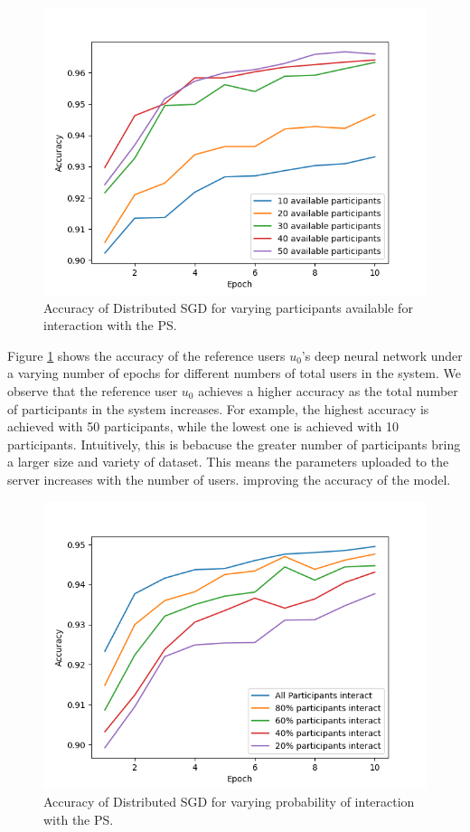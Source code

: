 \documentclass[conference]{IEEEtran}
\begin{document}
\begin{figure}[!h]
\centering
\includegraphics[width=\columnwidth, keepaspectratio]{VaryingPoolofParticipants}
\caption{Accuracy of Distributed SGD for varying participants available for interaction with the PS.}
\label{fig:VaryingPoolofParticipants}
\end{figure}

Figure \ref{fig:VaryingPoolofParticipants} shows the accuracy of the reference users $u_0$'s deep neural network under a varying number of epochs for different numbers of total users in the system. We observe that 
the reference user $u_0$ achieves a higher accuracy as the total number of participants in the system increases. For example, the
highest accuracy is achieved with 50 participants, while the lowest one is achieved with 10 participants. Intuitively, this is bebacuse the greater number of participants bring a larger size and variety of dataset. This means the parameters uploaded to the server increases with the number of users. improving the accuracy of the model.

\begin{figure}[!h]
\centering
\includegraphics[width=\columnwidth, keepaspectratio]{VaryingProbabilityInteraction}
\caption{Accuracy of Distributed SGD for varying probability of interaction with the PS. }
\label{fig:VaryingProbabilityInteraction}
\end{figure}
\end{document}
